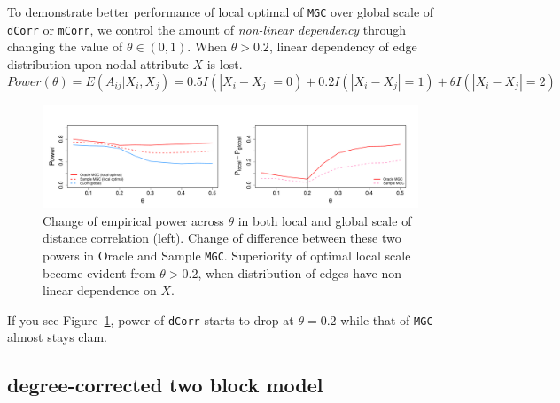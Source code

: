 \documentclass[12pt]{article}
\theoremstyle{definition}
\begin{document}
 To demonstrate better performance of local optimal of \texttt{MGC} over global scale of \texttt{dCorr} or \texttt{mCorr}, we control the amount of \textit{non-linear dependency} through changing the value of $\theta \in (0, 1)$. When $\theta > 0.2$, linear dependency of edge distribution upon nodal attribute $X$ is lost.
\begin{equation}
Power(\theta) = E(A_{ij} | X_{i}, X_{j}) = 0.5 I(|X_{i} - X_{j}| = 0) + 0.2 I(|X_{i} - X_{j}| = 1) + \theta I(|X_{i} - X_{j}| = 2)
\end{equation}

\begin{figure}[H]
	\centering
	\includegraphics[width=7in]{../Figure/powerplot.pdf}
	\caption{Change of empirical power across $\theta$ in both local and global scale of distance correlation (left). Change of difference between these two powers in Oracle and Sample \texttt{MGC}. Superiority of optimal local scale become evident from $\theta > 0.2$, when distribution of edges have non-linear dependence on $X$.}
	\label{fig:powerplot}
\end{figure}
If you see Figure~\ref{fig:powerplot}, power of \texttt{dCorr} starts to drop at $\theta = 0.2$ while that of \texttt{MGC} almost stays clam.

\subsection{degree-corrected two block model}
\end{document}
